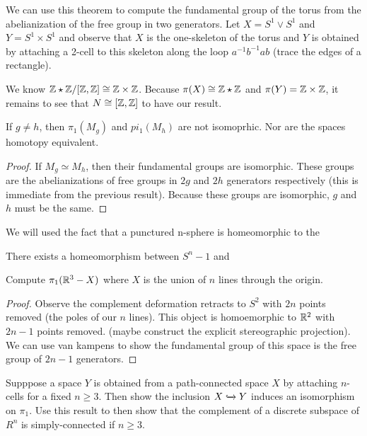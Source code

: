 \documentclass[10pt]{article}
\begin{document}
We can use this theorem to compute the fundamental group of the torus from the abelianization of the free group in two generators. Let $X = S^1 \vee S^1$ and $Y = S^1 \times S^1$ and observe that $X$ is the one-skeleton of the torus and $Y$ is obtained by attaching a 2-cell to this skeleton along the loop $a^{-1}b^{-1}ab$ (trace the edges of a rectangle).

We know $\mathbb{Z} \star \mathbb{Z} / [\mathbb{Z}, \mathbb{Z}]  \cong \mathbb{Z} \times \mathbb{Z}$. Because $\pi(X) \cong \mathbb{Z} \star \mathbb{Z}$ and $\pi(Y) = \mathbb{Z} \times \mathbb{Z}$, it remains to see that $N \cong [\mathbb{Z}, \mathbb{Z}]$ to have our result. 


\begin{theorem}
	If $g \neq h$, then $\pi_1(M_g)$ and $pi_1(M_h)$ are not isomoprhic. Nor are the spaces homotopy equivalent.
\end{theorem}

\begin{proof}
	If $M_g \simeq M_h$, then their fundamental groups are isomorphic. These groups are the abelianizations of free groups in $2g$ and $2h$ generators respectively (this is immediate from the previous result). Because these groups are isomorphic, $g$ and $h$ must be the same.
\end{proof}


We will used the fact that a punctured n-sphere is homeomorphic to the 

\begin{proposition}
There exists a homeomorphism between $S^n-1$ and
\end{proposition}

\begin{exercise}[1.2.4]
	Compute $\pi_1(\mathbb{R}^3 - X)$ where $X$ is the union of $n$ lines through the origin.
\end{exercise}

\begin{proof}
	Observe the complement deformation retracts to $S^2$ with $2n$ points removed (the poles of our $n$ lines). This object is homoemorphic to $\mathbb{R}^2$ with $2n-1$ points removed. (maybe construct the explicit stereographic projection). We can use van kampens to show the fundamental group of this space is the free group of $2n-1$ generators.
\end{proof}

\begin{exercise}[1.2.6]
	Supppose a space $Y$ is obtained from a path-connected space $X$ by attaching
	$n$-cells for a fixed $n \geq 3$. Then show the inclusion $X
	\xhookrightarrow{} Y$ induces an isomorphism on $\pi_1$. Use this result to
	then show	that the complement of a discrete subspace of $R^n$ is simply-connected if $n
	\geq 3$.
\end{exercise}
\end{document}
